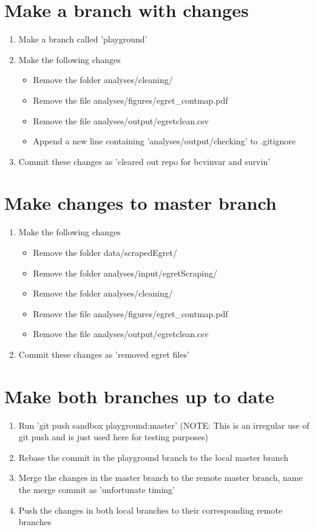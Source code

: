 \documentclass[11pt]{article}
\begin{document}
\section{Make a branch with changes}
\begin{enumerate}
  \item Make a branch called 'playground'
  \item Make the following changes
  \begin{itemize}
    \item Remove the folder analyses/cleaning/
    \item Remove the file analyses/figures/egret\_contmap.pdf
    \item Remove the file analyses/output/egretclean.csv
    \item Append a new line containing 'analyses/output/checking' to .gitignore
  \end{itemize}
  
  \item Commit these changes as 'cleared out repo for bcvinvar and survin' 
\end{enumerate}

\section{Make changes to master branch}
\begin{enumerate}
  \item Make the following changes
  \begin{itemize}
    \item Remove the folder data/scrapedEgret/
    \item Remove the folder analyses/input/egretScraping/
    \item Remove the folder analyses/cleaning/
    \item Remove the file analyses/figures/egret\_contmap.pdf
    \item Remove the file analyses/output/egretclean.csv
  \end{itemize}
  
  \item Commit these changes as 'removed egret files'
\end{enumerate}

\section{Make both branches up to date}
\begin{enumerate}
  \item Run 'git push sandbox playground:master' (NOTE: This is an irregular use of git push and is just used here for testing purposes)
  \item Rebase the commit in the playground branch to the local master branch
  \item Merge the changes in the master branch to the remote master branch, name the merge commit as 'unfortunate timing'
  \item Push the changes in both local branches to their corresponding remote branches
\end{enumerate}
\end{document}
